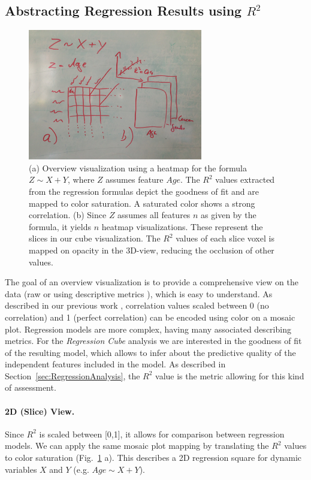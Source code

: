 \documentclass[journal]{style/vgtc} 			          %
\begin{document}
\subsection{Abstracting Regression Results using $R^2$}
\begin{figure}[htb]
 \centering
 \includegraphics[width=3.0in]{figures/cube_sketch}
 \caption{
 (a) Overview visualization using a heatmap for the formula $Z \sim X + Y$, where $Z$ assumes feature $Age$.
 The $R^2$ values extracted from the regression formulas depict the goodness of fit and are mapped to color saturation.
 A saturated color shows a strong correlation.
 (b) Since $Z$ assumes all features $n$ as given by the formula, it yields $n$ heatmap visualizations.
 These represent the slices in our cube visualization.
 The $R^2$ values of each slice voxel is mapped on opacity in the 3D-view, reducing the occlusion of other values.
 }
  \label{fig:Cube}
\end{figure}
The goal of an overview visualization is to provide a comprehensive view on the data (raw or using descriptive metrics \cite{Bertini}), which is easy to understand.
As described in our previous work \cite{Klemm2014VIS}, correlation values scaled between 0 (no correlation) and 1 (perfect correlation) can be encoded using color on a mosaic plot.
Regression models are more complex, having many associated describing metrics.
For the \emph{Regression Cube} analysis we are interested in the goodness of fit of the resulting model, which allows to infer about the predictive quality of the independent features included in the model.
As described in Section~\ref{sec:RegressionAnalysis}, the $R^2$ value is the metric allowing for this kind of assessment.
\paragraph{2D (Slice) View.}
Since $R^2$ is scaled between [0,1], it allows for comparison between regression models.
We can apply the same mosaic plot mapping by translating the $R^2$ values to color saturation (Fig.~\ref{fig:Cube} a).
This describes a 2D regression square for dynamic variables $X$ and $Y$ (e.g. $Age \sim X + Y$).
\end{document}

